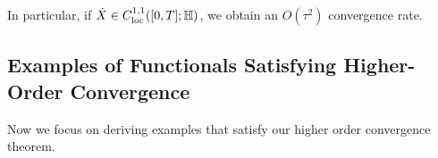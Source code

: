 \documentclass[11pt,a4paper]{amsart}
\newcommand{\1}{\mathds{1}}
\newtheorem{lemma}[theorem]{\textbf{Lemma}}
\numberwithin{equation}{section}
\begin{document}
In particular, if $\dot{X} \in C^{1,1}_{\textnormal{loc}}([0,T];\mathbb{H})$, we obtain an $O(\tau^2)$ convergence rate. \smallskip

\subsection{Examples of Functionals Satisfying Higher-Order Convergence}

Now we focus on deriving examples that satisfy our higher order convergence theorem.




\end{document}
